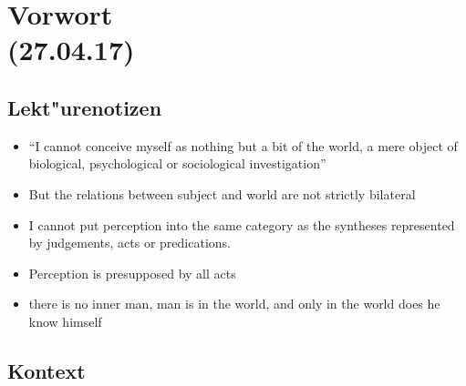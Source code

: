 \documentclass[emulatestandardclasses]{scrartcl}
\begin{document}
\section{Vorwort\\(27.04.17)}

\subsection{Lekt"urenotizen}

\begin{itemize}
  \item "`I cannot conceive myself as nothing but a bit of the world, a mere object of biological, psychological or sociological investigation"'
  \item But the relations between subject and world are not strictly bilateral
  \item I cannot put perception into the same category as the syntheses represented by judgements, acts or predications. 
  \item Perception is presupposed by all acts
  \item there is no inner man, man is in the world, and only in the world does he know himself
\end{itemize}

\subsection{Kontext}
\end{document}
